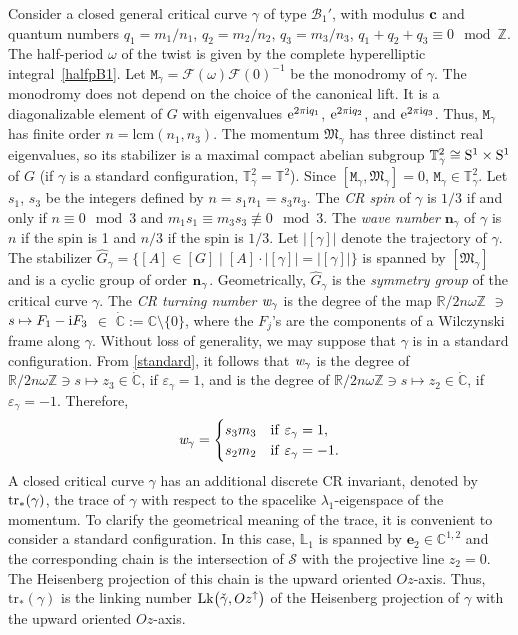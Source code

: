 \documentclass[pdftex]{sigma}
\numberwithin{equation}{section}
\def\C{\mathbb{C}}
\def\R{\mathbb{R}}
\def\Z{\mathbb{Z}}
\def\S{\mathcal{S}}
\def\S{\mathcal{S}}
\begin{document}
Consider a closed general critical curve $\gamma$ of type ${\mathcal B}_1'$,
with modulus ${\bf c}$
and quantum numbers $q_1=m_1/n_1$, $q_2=m_2/n_2$, $q_3=m_3/n_3$, $q_1+q_2+q_3\equiv 0 \mod \Z$.
The half-period $\omega$ of the twist is given by the complete hyperelliptic integral~\eqref{halfpB1}.
Let
${\mathtt M}_{\gamma}={\mathcal F}(\omega){\mathcal F}(0)^{-1}$ be the monodromy of $\gamma$.
The monodromy does not depend on the choice of the canonical lift.
It is a diagonalizable element of ${G}$ with eigenvalues ${\rm e}^{2\pi {\rm i} q_1}$, ${\rm e}^{2\pi {\rm i} q_2}$, and ${\rm e}^{2\pi {\rm i} q_3}$.
Thus, ${\mathtt M}_{\gamma}$ has finite order $n=\mathrm{lcm}(n_1,n_3)$.
The momentum ${\mathfrak M}_{\gamma}$ has three distinct real eigenvalues,
so its stabilizer is a maximal compact abelian subgroup ${\mathbb T}^2_{\gamma}\cong {\rm S}^1\times {\rm S}^1$ of ${G}$
\big(if $\gamma$ is a standard configuration, ${\mathbb T}^2_{\gamma}={\mathbb T}^2$\big).
Since $[{\mathtt M}_{\gamma},{\mathfrak M}_{\gamma}]=0$, ${\mathtt M}_{\gamma}\in {\mathbb T}^2_{\gamma}$.
Let $s_1$, $s_3$ be the integers defined by $n=s_1n_1=s_3n_3$. The \textit{CR spin} of $\gamma$ is $1/3$ if and only if
$n\equiv 0 \mod 3$ and $m_1s_1\equiv m_3s_3\not\equiv 0 \mod 3$.
The \textit{wave number} $\mathbf{n}_{\gamma}$ of $\gamma$ is $n$ if the spin is 1 and $n/3$ if the spin is $1/3$.
Let $|[\gamma]|$ denote the trajectory of $\gamma$.
The stabilizer $\hat{{G}}_{\gamma}=\{[A]\in [{G}]\mid [{A}]\cdot |[\gamma]| = |[\gamma]|\}$ is spanned by
$[{\mathfrak M}_{\gamma}]$ and is a cyclic group of order ${\bf n}_{\gamma}$.
Geometrically, $\hat{{G}}_{\gamma}$ is the \emph{symmetry group} of the critical curve $\gamma$.
The \textit{CR turning number} ${\it w}_{\gamma}$ is the degree of the map
$\R/2n\omega \Z$ $\ni$ $s\mapsto F_1-{\rm i} F_3$ $\in$ $\dot{\C} := \mathbb{C}\setminus \{0\}$,
where the $F_j$'s
are the components of a Wilczynski
frame
along $\gamma$.
Without loss of generality, we may suppose that $\gamma$ is in a standard configuration. From
\eqref{standard}, it follows that ${\it w}_{\gamma}$ is the degree of
$ \R/2n\omega \Z\ni s\mapsto z_3\in \dot{\C}$, if $\varepsilon_\gamma = 1$,
and is the degree of
$ \R/2n\omega \Z\ni s\mapsto z_2\in \dot{\C}$, if $\varepsilon_\gamma = -1$.
Therefore,
\[
 {\it w}_{\gamma}=
 \begin{cases} s_3m_3 & {\rm if}\ \varepsilon_{\gamma}=1,\\
 s_2m_2 & {\rm if}\ \varepsilon_{\gamma}=-1.
 \end{cases}
 \]
A closed critical curve $\gamma$ has an additional discrete CR invariant, denoted by ${\rm tr}_*(\gamma)$,
the trace of $\gamma$ with respect to
the spacelike $\lambda_1$-eigenspace of the momentum.
To clarify the geometrical meaning of the trace, it is convenient to consider a standard configuration.
In this case, ${\mathbb L}_1$ is spanned by $\mathbf{e}_2\in \C^{1,2}$
and the corresponding chain is the intersection of $\S$ with the projective line $z_2=0$. The Heisenberg projection
of this chain is the upward oriented $Oz$-axis. Thus, $\mathrm{tr}_*(\gamma)$ is the linking number ${\rm Lk}\big(\check{\gamma},Oz^{\uparrow}\big)$ of the Heisenberg projection of $\gamma$ with the upward oriented $Oz$-axis.
\end{document}
